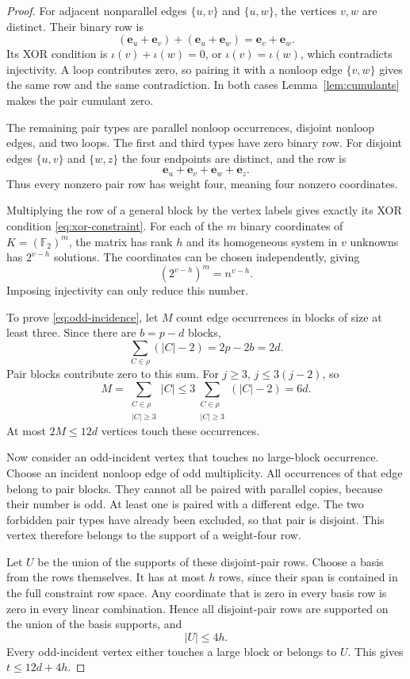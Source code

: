 \documentclass[11pt]{article}
\theoremstyle{definition}
\theoremstyle{remark}
\theoremstyle{plain}
\newcommand{\F}{\mathbb F}
\begin{document}
\begin{proof}
For adjacent nonparallel edges $\{u,v\}$ and $\{u,w\}$, the
vertices $v,w$ are distinct. Their binary row is
\[
 (\mathbf e_u+\mathbf e_v)+(\mathbf e_u+\mathbf e_w)
       =\mathbf e_v+\mathbf e_w.
\]
Its XOR condition is $\iota(v)+\iota(w)=0$, or
$\iota(v)=\iota(w)$, which contradicts injectivity. A loop
contributes zero, so pairing it with a nonloop edge $\{v,w\}$
gives the same row and the same contradiction. In both cases
Lemma~\ref{lem:cumulants} makes the pair cumulant zero.

The remaining pair types are parallel nonloop occurrences,
disjoint nonloop edges, and two loops. The first and third types
have zero binary row. For disjoint edges $\{u,v\}$ and
$\{w,z\}$ the four endpoints are distinct, and the row is
\[
                  \mathbf e_u+\mathbf e_v+\mathbf e_w+\mathbf e_z.
\]
Thus every nonzero pair row has weight four, meaning four nonzero
coordinates.

Multiplying the row of a general block by the vertex labels gives
exactly its XOR condition \eqref{eq:xor-constraint}. For each of
the $m$ binary coordinates of $K=(\F_2)^m$, the matrix has rank
$h$ and its homogeneous system in $v$ unknowns has $2^{v-h}$
solutions. The coordinates can be chosen independently, giving
\[
                         (2^{v-h})^m=n^{v-h}.
\]
Imposing injectivity can only reduce this number.

To prove \eqref{eq:odd-incidence}, let $M$ count edge occurrences
in blocks of size at least three. Since there are $b=p-d$ blocks,
\[
 \sum_{C\in\rho}(|C|-2)=2p-2b=2d.
\]
Pair blocks contribute zero to this sum. For $j\ge3$,
$j\le3(j-2)$, so
\[
 M=\sum_{\substack{C\in\rho\\|C|\ge3}}|C|
   \le3\sum_{\substack{C\in\rho\\|C|\ge3}}(|C|-2)=6d.
\]
At most $2M\le12d$ vertices touch these occurrences.

Now consider an odd-incident vertex that touches no large-block
occurrence. Choose an incident nonloop edge of odd multiplicity.
All occurrences of that edge belong to pair blocks. They cannot
all be paired with parallel copies, because their number is odd.
At least one is paired with a different edge. The two forbidden
pair types have already been excluded, so that pair is disjoint.
This vertex therefore belongs to the support of a weight-four row.

Let $U$ be the union of the supports of these disjoint-pair rows.
Choose a basis from the rows themselves. It has at most $h$ rows,
since their span is contained in the full constraint row space.
Any coordinate that is zero in every basis row is zero in every
linear combination. Hence all disjoint-pair rows are supported
on the union of the basis supports, and
\[
                              |U|\le4h.
\]
Every odd-incident vertex either touches a large block or belongs
to $U$. This gives $t\le12d+4h$.
\end{proof}
\end{document}
